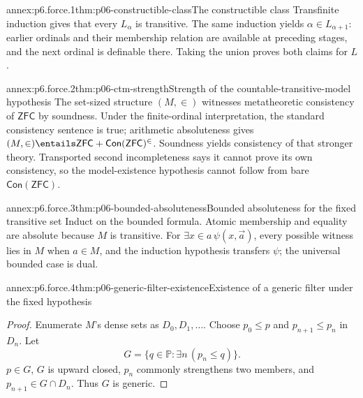 
\begin{annexitem}{annex:p6.force.1}{thm:p06-constructible-class}{The constructible class}
Transfinite induction gives that every \(L_\alpha\) is transitive.  The same
induction yields \(\alpha\in L_{\alpha+1}\): earlier ordinals and their
membership relation are available at preceding stages, and the next ordinal
is definable there.  Taking the union proves both claims for \(L\).
\end{annexitem}

\begin{annexitem}{annex:p6.force.2}{thm:p06-ctm-strength}{Strength of the countable-transitive-model hypothesis}
The set-sized structure \((M,\in)\) witnesses metatheoretic consistency of
\(\mathsf{ZFC}\) by soundness.  Under the finite-ordinal interpretation, the
standard consistency sentence is true; arithmetic absoluteness gives
\((M,\in)\entails\mathsf{ZFC}+\mathsf{Con}(\mathsf{ZFC})^\in\).
Soundness yields consistency of that stronger theory.  Transported second
incompleteness says it cannot prove its own consistency, so the model-existence
hypothesis cannot follow from bare \(\mathsf{Con}(\mathsf{ZFC})\).
\end{annexitem}

\begin{annexitem}{annex:p6.force.3}{thm:p06-bounded-absoluteness}{Bounded absoluteness for the fixed transitive set}
Induct on the bounded formula.  Atomic membership and equality are absolute
because \(M\) is transitive.  For
\(\exists x\in a\,\psi(x,\vec a)\), every possible witness lies in \(M\)
when \(a\in M\), and the induction hypothesis transfers \(\psi\); the
universal bounded case is dual.
\end{annexitem}

\begin{annexitem}{annex:p6.force.4}{thm:p06-generic-filter-existence}{Existence of a generic filter under the fixed hypothesis}
\begin{proof}
Enumerate \(M\)'s dense sets as \(D_0,D_1,\ldots\).  Choose
\(p_0\leq p\) and \(p_{n+1}\leq p_n\) in \(D_n\).  Let
\[
  G=\{q\in\mathbb P:\exists n\,(p_n\leq q)\}.
\]
\(p\in G\), \(G\) is upward closed, \(p_n\) commonly strengthens
two members, and \(p_{n+1}\in G\cap D_n\).  Thus \(G\) is generic.
\end{proof}
\end{annexitem}

